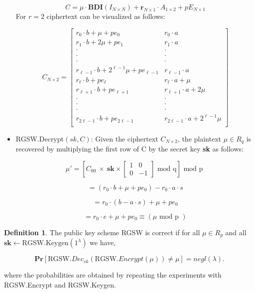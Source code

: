 \documentclass[10pt,journal,compsoc]{IEEEtran}
\theoremstyle{definition}
\newtheorem{definition}{Definition}[section]
\begin{document}
\begin{itemize}
$$C = \mu\cdot\textbf{BDI}\left( I_{N\times N} \right) + \textbf{r}_{N\times 1}\cdot A_{1\times 2} + pE_{N\times 1}$$
For $r=2$ ciphertext can be visualized as follows:

\[
C_{N\times 2} =
  \begin{bmatrix}
    r_0\cdot b + \mu + pe_0 & r_0\cdot a \\
    r_1\cdot b + 2\mu + pe_1 & r_1\cdot a \\
    \cdot & \cdot\\
    \cdot & \cdot\\
    \cdot & \cdot\\
    r_{\ell -1}\cdot b + 2^{\ell -1}\mu + pe_{\ell -1} &  r_{\ell -1}\cdot a\\
     r_{\ell}\cdot b + pe_{\ell} & r_{\ell}\cdot a + \mu\\
     r_{\ell + 1}\cdot b + pe_{\ell + 1} & r_{\ell + 1}\cdot a + 2\mu\\
    \cdot & \cdot\\
    \cdot & \cdot\\
    \cdot & \cdot\\
     r_{2\ell - 1}\cdot b + pe_{2\ell - 1} & r_{2\ell - 1}\cdot a + 2^{\ell - 1}\mu\\
  \end{bmatrix}
\]


\item RGSW.Decrypt$\left(sk, C\right)$:  Given the ciphertext $C_{N \times 2}$, the plaintext $\mu \in R_q$ is recovered by multiplying the first row of C by the secret key \textbf{sk} as follows:

$${\mu}' = \left[ C_{00} \ \times \ \textbf{sk} \times
\left[ 
\begin{smallmatrix} 
1 & 0\\
0 & -1  
\end{smallmatrix}
\right]
\textrm{ mod q}\right] \textrm{ mod p }
$$

$$= \left( r_0\cdot b + \mu + pe_0 \right) - r_0\cdot a \cdot s $$

$$=  r_0\cdot \left(b - a\cdot s\right) + \mu + pe_0 $$

$$=  r_0\cdot e + \mu + pe_0 \equiv \left( \mu \textrm{ mod p } \right) $$

\end{itemize}

\begin{definition}

The public key scheme RGSW is correct if for all $\mu \in R_p$ and all $\textbf{sk} \leftarrow \textrm{RGSW.Keygen}\left( 1^\lambda\right)$ we have,

$$\textbf{Pr}\left[ \textrm{RGSW.}Dec_{sk}\left( \textrm{RGSW.}Encrypt\left( \mu\right)\right) \neq \mu \right] = negl\left(\lambda\right).$$

where the probabilities are obtained by repeating the experiments with RGSW.Encrypt and RGSW.Keygen. 

\end{definition}
\end{document}
